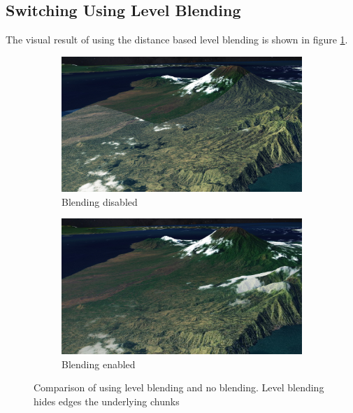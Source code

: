 \subsection{Switching Using Level Blending}
\label{section:res_switching}
\FloatBarrier
The visual result of using the distance based level blending is shown in figure \ref{fig:blending2}.
\begin{figure}[h]
    \centering
    \begin{subfigure}[bt]{0.48\textwidth}
        \includegraphics[width=\textwidth]{figures/results/blending/blending_bali2_disabled.jpg}
        \caption{Blending disabled}
    \end{subfigure}
    \begin{subfigure}[bt]{0.48\textwidth}
        \includegraphics[width=\textwidth]{figures/results/blending/blending_bali2_enabled.jpg}
        \caption{Blending enabled}
    \end{subfigure}
    \caption{Comparison of using level blending and no blending. Level blending hides edges the underlying chunks}
    \label{fig:blending2}
\end{figure}

